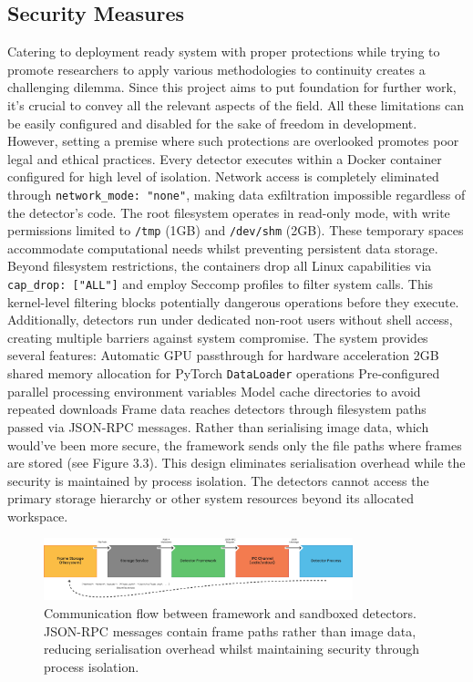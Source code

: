 \subsection{Security Measures}
Catering to deployment ready system with proper protections while trying to promote researchers to apply various methodologies to continuity creates a challenging dilemma. Since this project aims to put foundation for further work, it's crucial to convey all the relevant aspects of the field. All these limitations can be easily configured and disabled for the sake of freedom in development. However, setting a premise where such protections are overlooked promotes poor legal and ethical practices. 
Every detector executes within a Docker container configured for high level of isolation. Network access is completely eliminated through \verb|network_mode: "none"|, making data exfiltration impossible regardless of the detector's code. The root filesystem operates in read-only mode, with write permissions limited to \verb|/tmp| (1GB) and \verb|/dev/shm| (2GB). These temporary spaces accommodate computational needs whilst preventing persistent data storage.
Beyond filesystem restrictions, the containers drop all Linux capabilities via \verb|cap_drop: ["ALL"]| and employ Seccomp profiles to filter system calls. This kernel-level filtering blocks potentially dangerous operations before they execute. Additionally, detectors run under dedicated non-root users without shell access, creating multiple barriers against system compromise.
The system provides several features:
Automatic GPU passthrough for hardware acceleration
2GB shared memory allocation for PyTorch \texttt{DataLoader} operations
Pre-configured parallel processing environment variables
Model cache directories to avoid repeated downloads
Frame data reaches detectors through filesystem paths passed via JSON-RPC messages. Rather than serialising image data, which would've been more secure, the framework sends only the file paths where frames are stored (see Figure 3.3). This design eliminates serialisation overhead while the security is maintained by process isolation. The detectors cannot access the primary storage hierarchy or other system resources beyond its allocated workspace.

\begin{figure}[h]
\centering
\includegraphics[width=0.8\textwidth]{figures/comms flow.png}
\caption{Communication flow between framework and sandboxed detectors. JSON-RPC messages contain frame paths rather than image data, reducing serialisation overhead whilst maintaining security through process isolation.}
\label{fig:comms-flow}
\end{figure} 
